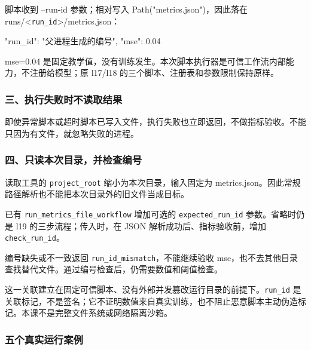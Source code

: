 \documentclass[UTF8,zihao=-4,fontset=fandol]{ctexart}
\begin{document}
脚本收到 --run-id 参数；相对写入 Path("metrics.json")，因此落在 runs/<\nolinkurl{run_id}>/metrics.json：

\begin{Code}
{"run_id": "父进程生成的编号", "mse": 0.04}
\end{Code}

mse=0.04 是固定教学值，没有训练发生。本次脚本执行器是可信工作流内部能力，不注册给模型；原 l17/l18 的三个脚本、注册表和参数限制保持原样。

\subsubsection{三、执行失败时不读取结果}

即使异常脚本或超时脚本已写入文件，执行失败也立即返回，不做指标验收。不能只因为有文件，就忽略失败的进程。

\subsubsection{四、只读本次目录，并检查编号}

读取工具的 \nolinkurl{project_root} 缩小为本次目录，输入固定为 metrics.json。因此常规路径解析也不能把本次目录外的旧文件当成目标。

已有 \nolinkurl{run_metrics_file_workflow} 增加可选的 \nolinkurl{expected_run_id} 参数。省略时仍是 l19 的三步流程；传入时，在 JSON 解析成功后、指标验收前，增加 \nolinkurl{check_run_id}。

编号缺失或不一致返回 \nolinkurl{run_id_mismatch}，不能继续验收 mse，也不去其他目录查找替代文件。通过编号检查后，仍需要数值和阈值检查。

这一关联建立在固定可信脚本、没有外部并发篡改运行目录的前提下。\nolinkurl{run_id} 是关联标记，不是签名；它不证明数值来自真实训练，也不阻止恶意脚本主动伪造标记。本课不是完整文件系统或网络隔离沙箱。

\subsubsection{五个真实运行案例}
\end{document}
